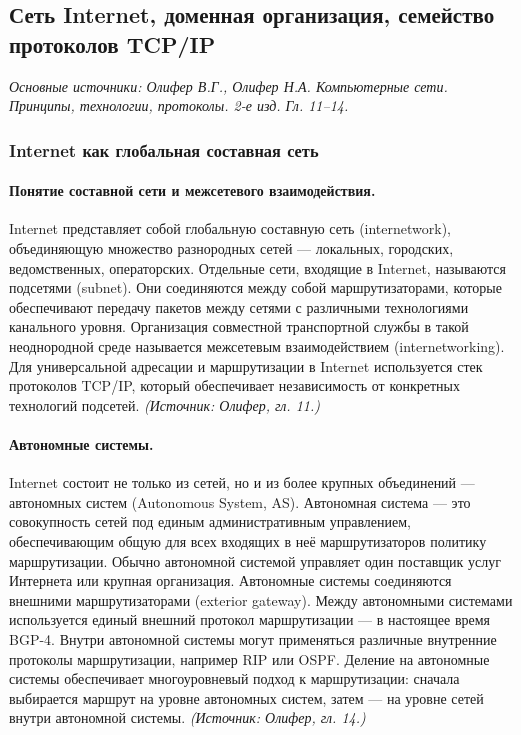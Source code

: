 \documentclass[a4paper,12pt]{article}
\begin{document}
\subsection{Сеть Internet, доменная организация, семейство протоколов TCP/IP}

\noindent\textit{Основные источники: Олифер В.Г., Олифер Н.А. Компьютерные сети. Принципы, технологии, протоколы. 2-е изд. Гл. 11–14.}

\subsubsection{Internet как глобальная составная сеть}

\paragraph{Понятие составной сети и межсетевого взаимодействия.}
Internet представляет собой глобальную составную сеть (internetwork), объединяющую множество разнородных сетей — локальных, городских, ведомственных, операторских. Отдельные сети, входящие в Internet, называются подсетями (subnet). Они соединяются между собой маршрутизаторами, которые обеспечивают передачу пакетов между сетями с различными технологиями канального уровня. Организация совместной транспортной службы в такой неоднородной среде называется межсетевым взаимодействием (internetworking). Для универсальной адресации и маршрутизации в Internet используется стек протоколов TCP/IP, который обеспечивает независимость от конкретных технологий подсетей.
\textit{(Источник: Олифер, гл. 11.)}

\paragraph{Автономные системы.}
Internet состоит не только из сетей, но и из более крупных объединений — автономных систем (Autonomous System, AS). Автономная система — это совокупность сетей под единым административным управлением, обеспечивающим общую для всех входящих в неё маршрутизаторов политику маршрутизации. Обычно автономной системой управляет один поставщик услуг Интернета или крупная организация. Автономные системы соединяются внешними маршрутизаторами (exterior gateway). Между автономными системами используется единый внешний протокол маршрутизации — в настоящее время BGP-4. Внутри автономной системы могут применяться различные внутренние протоколы маршрутизации, например RIP или OSPF. Деление на автономные системы обеспечивает многоуровневый подход к маршрутизации: сначала выбирается маршрут на уровне автономных систем, затем — на уровне сетей внутри автономной системы.
\textit{(Источник: Олифер, гл. 14.)}
\end{document}
